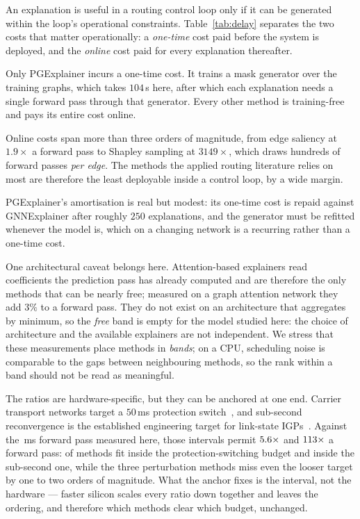 \documentclass[conference]{IEEEtran}
\begin{document}
An explanation is useful in a routing control loop only if it can be generated
within the loop's operational constraints. Table~\ref{tab:delay} separates the
two costs that matter operationally: a \emph{one-time} cost paid before the
system is deployed, and the \emph{online} cost paid for every explanation
thereafter.

Only PGExplainer incurs a one-time cost. It trains a mask generator over the
training graphs, which takes $104$\,s here, after which each explanation needs
a single forward pass through that generator. Every other method is
training-free and pays its entire cost online.

Online costs span more than three orders of magnitude, from edge saliency at
$1.9\times$ a forward pass to Shapley sampling at $3149\times$, which draws
hundreds of forward passes \emph{per edge}. The methods the applied routing
literature relies on most are therefore the least deployable inside a control
loop, by a wide margin.

PGExplainer's amortisation is real but modest: its one-time cost is repaid
against GNNExplainer after roughly $250$ explanations, and the generator must
be refitted whenever the model is, which on a changing network is a recurring
rather than a one-time cost.

One architectural caveat belongs here. Attention-based explainers read
coefficients the prediction pass has already computed and are therefore the
only methods that can be nearly free; measured on a graph attention network
they add $3\%$ to a forward pass. They do not exist on an architecture that
aggregates by minimum, so the \emph{free} band is empty for the model studied
here: the choice of architecture and the available explainers are not
independent.
We stress that these
measurements place methods in \emph{bands}; on a CPU, scheduling noise is
comparable to the gaps between neighbouring methods, so the rank within a band
should not be read as meaningful.

The ratios are hardware-specific, but they can be anchored at one end.
Carrier transport networks target a $50$\,ms protection switch~\cite{itu2018g841},
and sub-second reconvergence is the established engineering target for
link-state IGPs~\cite{francois2005subsecond}. Against the \DelayBaseline\,ms
forward pass measured here, those intervals permit $5.6\times$ and
$113\times$ a forward pass: \NFitsFifty{} of \NDelayMethods{}
methods fit inside the protection-switching budget and \NFitsSecond{} inside
the sub-second one, while the three perturbation methods miss even the looser
target by one to two orders of magnitude. What the anchor fixes is the
interval, not the hardware --- faster silicon scales every ratio down together
and leaves the ordering, and therefore which methods clear which budget,
unchanged.
\end{document}
